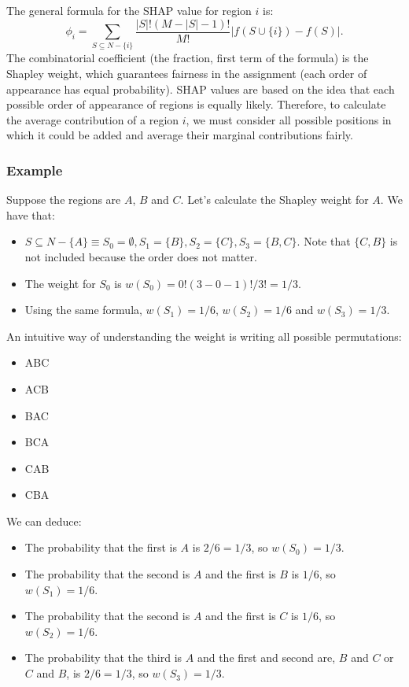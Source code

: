 The general formula for the SHAP value for region $i$ is:
$$\phi_i = \sum_{S\subseteq N-\{i\}} \dfrac{|S|! \left(M-|S|-1\right)!}{M!}\left|f\left(S\cup \{i\}\right) - f\left(S\right)\right|.$$
The combinatorial coefficient (the fraction, first term of the formula) is the Shapley weight, which guarantees fairness in the assignment (each order of appearance has equal probability). SHAP values are based on the idea that each possible order of appearance of regions is equally likely. Therefore, to calculate the average contribution of a region $i$, we must consider all possible positions in which it could be added and average their marginal contributions fairly.

\subsubsection{Example}

Suppose the regions are $A$, $B$ and $C$. Let's calculate the Shapley weight for $A$. We have that:
\begin{itemize}
\item $S\subseteq N-\{A\} \equiv S_0=\emptyset, S_1=\{B\}, S_2=\{C\}, S_3=\{B, C\}$. Note that $\{C, B\}$ is not included because the order does not matter.
\item The weight for $S_0$ is $w(S_0)=0!(3-0-1)!/3!=1/3$.
\item Using the same formula, $w(S_1)=1/6$, $w(S_2)=1/6$ and $w(S_3)=1/3$.
\end{itemize}
An intuitive way of understanding the weight is writing all possible permutations:
\begin{itemize}
\item ABC
\item ACB
\item BAC
\item BCA
\item CAB
\item CBA
\end{itemize}
We can deduce:
\begin{itemize}
\item The probability that the first is $A$ is $2/6=1/3$, so $w(S_0)=1/3$.
\item The probability that the second is $A$ and the first is $B$ is $1/6$, so $w(S_1)=1/6$.
\item The probability that the second is $A$ and the first is $C$ is $1/6$, so $w(S_2)=1/6$.
\item The probability that the third is $A$ and the first and second are, $B$ and $C$ or $C$ and $B$, is $2/6=1/3$, so $w(S_3)=1/3$. 
\end{itemize}


